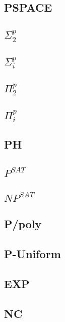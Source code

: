 \documentclass[]{article}
\theoremstyle{definition}
\begin{document}
\subsection{PSPACE}

\subsection{$\Sigma^p_2$}

\subsection{$\Sigma^p_i$}

\subsection{$\Pi^p_2$}

\subsection{$\Pi^p_i$}

\subsection{PH}

\subsection{$P^{SAT}$}

\subsection{$NP^{SAT}$}

\subsection{P/poly}

\subsection{P-Uniform}

\subsection{EXP}

\subsection{NC}
\end{document}
